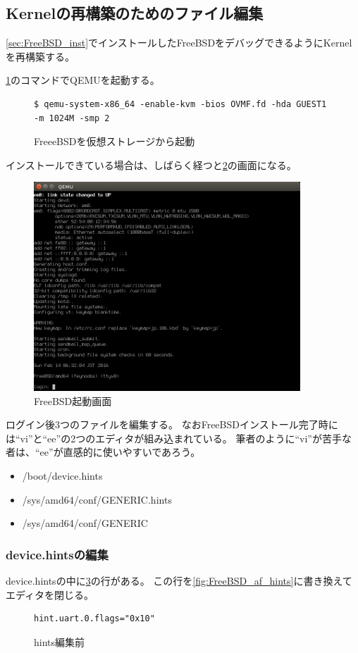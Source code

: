 \documentclass[a4j]{jarticle}
\begin{document}
\subsection{Kernelの再構築のためのファイル編集}
\ref{sec:FreeBSD_inst}でインストールしたFreeBSDをデバッグできるようにKernelを再構築する。

\ref{fig:FreeBSD_boot_com}のコマンドでQEMUを起動する。
\begin{figure}[htbp]
	\centering
	\begin{lstlisting}[basicstyle=\ttfamily\footnotesize, frame=single, breaklines=true]
$ qemu-system-x86_64 -enable-kvm -bios OVMF.fd -hda GUEST1 -m 1024M -smp 2
    \end{lstlisting}
	\caption{FreeeBSDを仮想ストレージから起動}
	\label{fig:FreeBSD_boot_com}
\end{figure}

インストールできている場合は、しばらく経つと\ref{fig:FreeBSD_BOOT}の画面になる。
\begin{figure}[htbp]
	\centering
	\includegraphics[width=10cm]{./IMG/FreeBSD_BOOT.png}
    \caption{FreeBSD起動画面}
    \label{fig:FreeBSD_BOOT}
\end{figure}

ログイン後3つのファイルを編集する。
なおFreeBSDインストール完了時には``vi''と``ee''の2つのエディタが組み込まれている。
筆者のように``vi''が苦手な者は、``ee''が直感的に使いやすいであろう。
\begin{itemize}
    \item /boot/device.hints
    \item /sys/amd64/conf/GENERIC.hints
    \item /sys/amd64/conf/GENERIC
\end{itemize}

\subsubsection{device.hintsの編集}
\label{sec:FreeBSD_device.hints}
device.hintsの中に\ref{fig:FreeBSD_bf_hints}の行がある。
この行を\ref{fig:FreeBSD_af_hints}に書き換えてエディタを閉じる。
\begin{figure}[htbp]
	\centering
	\begin{lstlisting}[basicstyle=\ttfamily\footnotesize, frame=single, breaklines=true]
hint.uart.0.flags="0x10"
	\end{lstlisting}
	\caption{hints編集前}
	\label{fig:FreeBSD_bf_hints}
\end{figure}
\end{document}

